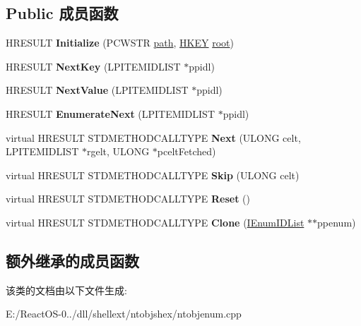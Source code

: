 \subsection*{Public 成员函数}
\begin{DoxyCompactItemize}
\item 
\mbox{\label{class_c_enum_reg_key_ae20e3158b7d8861652b5d11cc2a477f1}} 
H\+R\+E\+S\+U\+LT {\bfseries Initialize} (P\+C\+W\+S\+TR \hyperlink{structpath}{path}, \hyperlink{interfacevoid}{H\+K\+EY} \hyperlink{struct__root}{root})
\item 
\mbox{\label{class_c_enum_reg_key_a2f737e0533c91bb3b52104db4a822833}} 
H\+R\+E\+S\+U\+LT {\bfseries Next\+Key} (L\+P\+I\+T\+E\+M\+I\+D\+L\+I\+ST $\ast$ppidl)
\item 
\mbox{\label{class_c_enum_reg_key_a80379db2dadaa2beaff7476bbdbfde62}} 
H\+R\+E\+S\+U\+LT {\bfseries Next\+Value} (L\+P\+I\+T\+E\+M\+I\+D\+L\+I\+ST $\ast$ppidl)
\item 
\mbox{\label{class_c_enum_reg_key_ad2112d6903db8eab9a67868488c353d4}} 
H\+R\+E\+S\+U\+LT {\bfseries Enumerate\+Next} (L\+P\+I\+T\+E\+M\+I\+D\+L\+I\+ST $\ast$ppidl)
\item 
\mbox{\label{class_c_enum_reg_key_a0a1a5bbbf9f10cde117cca9d7627735c}} 
virtual H\+R\+E\+S\+U\+LT S\+T\+D\+M\+E\+T\+H\+O\+D\+C\+A\+L\+L\+T\+Y\+PE {\bfseries Next} (U\+L\+O\+NG celt, L\+P\+I\+T\+E\+M\+I\+D\+L\+I\+ST $\ast$rgelt, U\+L\+O\+NG $\ast$pcelt\+Fetched)
\item 
\mbox{\label{class_c_enum_reg_key_a12718ddc6fc378b04b1a76d22f25b7ae}} 
virtual H\+R\+E\+S\+U\+LT S\+T\+D\+M\+E\+T\+H\+O\+D\+C\+A\+L\+L\+T\+Y\+PE {\bfseries Skip} (U\+L\+O\+NG celt)
\item 
\mbox{\label{class_c_enum_reg_key_ad942910de9d9515498363b4edfdf5bc5}} 
virtual H\+R\+E\+S\+U\+LT S\+T\+D\+M\+E\+T\+H\+O\+D\+C\+A\+L\+L\+T\+Y\+PE {\bfseries Reset} ()
\item 
\mbox{\label{class_c_enum_reg_key_a6dd6f7615095a06230d663e885e2b394}} 
virtual H\+R\+E\+S\+U\+LT S\+T\+D\+M\+E\+T\+H\+O\+D\+C\+A\+L\+L\+T\+Y\+PE {\bfseries Clone} (\hyperlink{interface_i_enum_i_d_list}{I\+Enum\+I\+D\+List} $\ast$$\ast$ppenum)
\end{DoxyCompactItemize}
\subsection*{额外继承的成员函数}


该类的文档由以下文件生成\+:\begin{DoxyCompactItemize}
\item 
E\+:/\+React\+O\+S-\/0../dll/shellext/ntobjshex/ntobjenum.\+cpp\end{DoxyCompactItemize}
